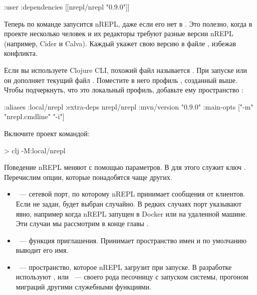 \begin{english}
  \begin{clojure}
{:user {:dependencies [[nrepl/nrepl "0.9.0"]]}}
  \end{clojure}
\end{english}

Теперь по команде  запусится nREPL, даже если его нет в . Это полезно, когда в проекте несколько человек и их редакторы требуют разные версии nREPL (например, Cider и Calva). Каждый укажет свою версию в файле , избежав конфликта.

Если вы используете Clojure CLI, похожий файл называется . При запуске  или  он дополняет текущий файл . Поместите в него профиль , созданный выше. Чтобы подчеркнуть, что это локальный профиль, добавьте ему пространство :

\begin{english}
  \begin{clojure}
{:aliases
 {:local/nrepl
  {:extra-deps {nrepl/nrepl {:mvn/version "0.9.0"}}
   :main-opts ["-m" "nrepl.cmdline" "-i"]}}}
  \end{clojure}
\end{english}

Включите проект командой:

\begin{english}
  \begin{bash}
> clj -M:local/nrepl
  \end{bash}
\end{english}

Поведение nREPL меняют с помощью параметров. В  для этого служит ключ . Перечислим опции, которые понадобятся чаще других.

\begin{itemize}

\item
  ~--- сетевой порт, по которому nREPL принимает сообщения от клиентов. Если не задан, будет выбран случайно. В редких случаях порт указывают явно, например когда nREPL запущен в Docker или на удаленной машине. Эти случаи мы рассмотрим в конце главы .

\item
  ~--- функция приглашения. Принимает пространство имен и по умолчанию выводит его имя.

\item
  ~--- пространство, которое nREPL загрузит при запуске. В разработке используют ,  или ~--- своего рода песочницу с запуском системы, прогоном миграций другими служебными функциями.

\end{itemize}

